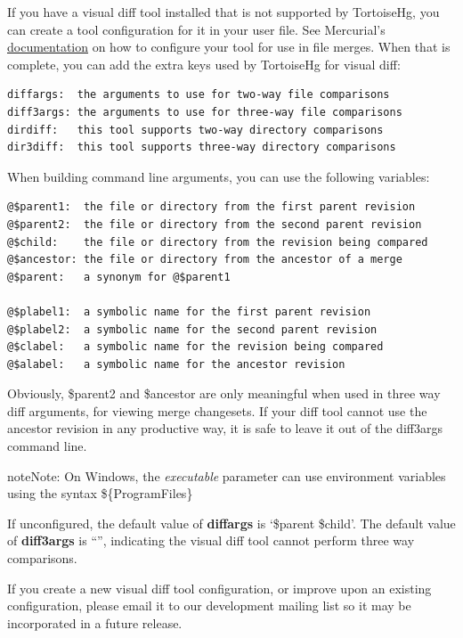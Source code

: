 \documentclass[letterpaper,10pt,english]{manual}
\begin{document}
If you have a visual diff tool installed that is not supported by
TortoiseHg, you can create a tool configuration for it in your user
 file.  See Mercurial's
\href{http://www.selenic.com/mercurial/hgrc.5.html\#merge-tools}{documentation}
on how to configure your tool for use in file merges.  When that is
complete, you can add the extra keys used by TortoiseHg for visual
diff:

\begin{Verbatim}[commandchars=@\[\]]
diffargs:  the arguments to use for two-way file comparisons
diff3args: the arguments to use for three-way file comparisons
dirdiff:   this tool supports two-way directory comparisons
dir3diff:  this tool supports three-way directory comparisons
\end{Verbatim}

When building command line arguments, you can use the following
variables:

\begin{Verbatim}[commandchars=@\[\]]
@$parent1:  the file or directory from the first parent revision
@$parent2:  the file or directory from the second parent revision
@$child:    the file or directory from the revision being compared
@$ancestor: the file or directory from the ancestor of a merge
@$parent:   a synonym for @$parent1

@$plabel1:  a symbolic name for the first parent revision
@$plabel2:  a symbolic name for the second parent revision
@$clabel:   a symbolic name for the revision being compared
@$alabel:   a symbolic name for the ancestor revision
\end{Verbatim}

Obviously, \$parent2 and \$ancestor are only meaningful when used in three
way diff arguments, for viewing merge changesets.  If your diff tool
cannot use the ancestor revision in any productive way, it is safe to
leave it out of the diff3args command line.

\begin{notice}{note}{Note:}
On Windows, the \emph{executable} parameter can use environment variables
using the syntax \$\{ProgramFiles\}
\end{notice}

If unconfigured, the default value of \textbf{diffargs} is `\$parent \$child'.
The default value of \textbf{diff3args} is ``'', indicating the visual diff
tool cannot perform three way comparisons.

If you create a new visual diff tool configuration, or improve upon an
existing configuration, please email it to our development mailing list
so it may be incorporated in a future release.
\end{document}
